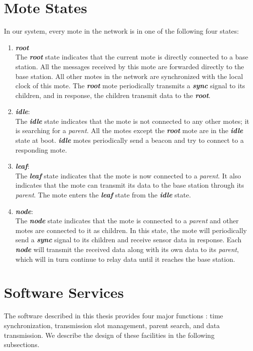 \section{Mote States}
In our system, every mote in the network is in one of the following four states:
\begin{enumerate}
\item \textbf{\textit{root}}\\The \textbf{\textit{root}} state indicates that the current mote is directly connected to a base station. All the messages received by this mote are forwarded directly to the base station. All other motes in the network are synchronized with the local clock of this mote. The \textbf{\textit{root}} mote periodically transmits a \textbf{\textit{sync}} signal to its children, and in response, the children transmit data to the \textbf{\textit{root}}.
\item \textbf{\textit{idle}}: \\The \textbf{\textit{idle}} state indicates that the mote is not connected to any other motes; it is searching for a \textit{parent}. All the motes except the \textbf{\textit{root}} mote are in the \textbf{\textit{idle}} state at boot. \textbf{\textit{idle}} motes periodically send a beacon and try to connect to a responding mote.
\item \textbf{\textit{leaf}}: \\The \textbf{\textit{leaf}} state indicates that the mote is now connected to a \textit{parent}. It also indicates that the mote can transmit its data to the base station through its \textit{parent}. The mote enters the \textbf{\textit{leaf}} state from the \textbf{\textit{idle}} state.
\item \textbf{\textit{node}}: \\The \textbf{\textit{node}} state indicates that the mote is connected to a \textit{parent} and other motes are connected to it as children. In this state, the mote will periodically send a \textbf{\textit{sync}} signal to its children and receive sensor data in response.  Each \textbf{\textit{node}} will transmit the received data along with its own data to its \textit{parent}, which will in turn continue to relay data until it reaches the base station.
\end{enumerate}

\section{Software Services}
The software described in this thesis provides four major functions : time synchronization, transmission slot management, parent search, and data transmission. We describe the design of these facilities in the following subsections.

